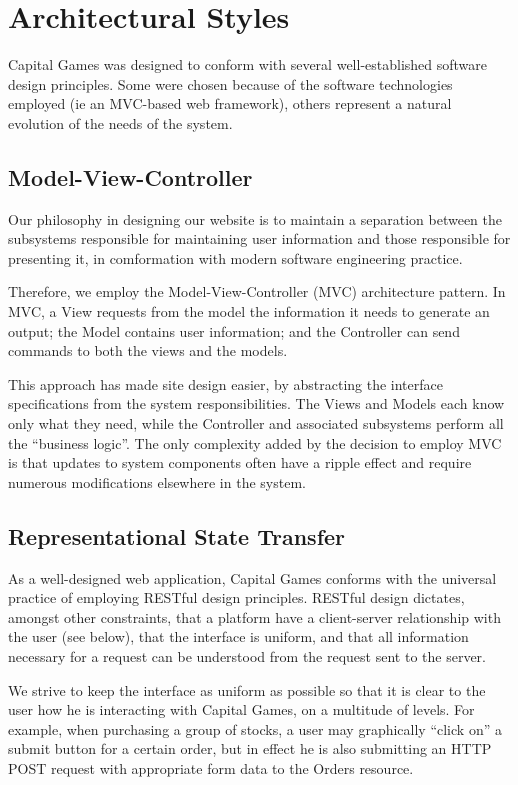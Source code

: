 \section{Architectural Styles}

Capital Games was designed to conform with several well-established
software design principles. 
Some were chosen because of the software technologies
employed (ie an MVC-based web framework), others 
represent a natural evolution of the needs of the 
system. 

\subsection{Model-View-Controller}

Our philosophy in designing our website is to maintain
a separation between the subsystems responsible for 
maintaining user information and those responsible
for presenting it, in comformation with modern software
engineering practice. 

Therefore, we employ the Model-View-Controller (MVC)
architecture pattern. In MVC, a View requests from the
model the information it needs to generate an output;
the Model contains user information; and the Controller
can send commands to both the views and the models. \cite{wiki:mvc} 

This approach has made site design easier,
by abstracting the interface specifications from the 
system responsibilities. The Views and Models each know 
only what they need, while the Controller and associated
subsystems perform all the ``business logic''. The only
complexity added by the decision to employ MVC is that
updates to system components often have a ripple effect
and require numerous modifications elsewhere in the system.

\subsection{Representational State Transfer}

As a well-designed web application, Capital Games 
conforms with the universal practice of employing
RESTful design principles. RESTful design dictates,
amongst other constraints, that a platform have a
client-server relationship with the user (see below),
that the interface is uniform, and that all information
necessary for a request can be understood from the
request sent to the server. \cite{wiki:restful} 

We strive to keep the interface as uniform as possible
so that it is clear to the user how he is interacting
with Capital Games, on a multitude of levels. For example,
when purchasing a group of stocks, a user may graphically
``click on'' a submit button for a certain order, but
in effect he is also submitting an HTTP POST request with
appropriate form data to the Orders resource. 


